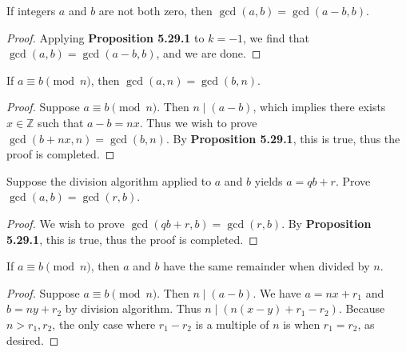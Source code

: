 \documentclass{exam}
\begin{document}
\begin{proposition}{5.29}
    If integers $a$ and $b$ are not both zero, then $\gcd(a,b)=\gcd(a-b,b)$.
\end{proposition}

\begin{proof}
    Applying \textbf{Proposition 5.29.1} to $k=-1$, we find that $\gcd(a, b)=\gcd(a-b, b)$, and we are done.
\end{proof}

\begin{proposition}{5.30}
    If $a\equiv b\pmod n$, then $\gcd(a, n)=\gcd(b,n)$.
\end{proposition}

\begin{proof}
    Suppose $a\equiv b\pmod n$. Then $n\mid (a-b)$, which implies there exists $x\in\mathbb Z$ such that $a-b=nx$. Thus we wish to prove $\gcd(b+nx, n) = \gcd(b, n)$. By \textbf{Proposition 5.29.1}, this is true, thus the proof is completed.
\end{proof}

\begin{proposition}{5.31}
    Suppose the division algorithm applied to $a$ and $b$ yields $a=qb+r$. Prove $\gcd(a,b)=\gcd(r,b)$.
\end{proposition}

\begin{proof}
    We wish to prove $\gcd(qb + r,  b) = \gcd(r, b)$. By \textbf{Proposition 5.29.1}, this is true, thus the proof is completed.
\end{proof}

\begin{proposition}{5.32}
    If $a\equiv b\pmod n$, then $a$ and $b$ have the same remainder when divided by $n$.
\end{proposition}

\begin{proof}
    Suppose $a\equiv b\pmod n$. Then $n\mid(a-b)$. We have $a = nx + r_1$ and $b = ny + r_2$ by division algorithm. Thus $n\mid(n(x-y)+r_1-r_2)$. Because $n>r_1,r_2$, the only case where $r_1 - r_2$ is a multiple of $n$ is when $r_1 = r_2$, as desired.
\end{proof}
\end{document}
